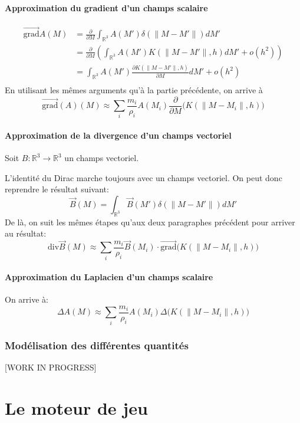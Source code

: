 \documentclass[a4paper,10pt]{report}
\begin{document}
\newpage

\subsubsection{Approximation du gradient d'un champs scalaire}
\begin{align*}
 \vec{\text{grad}}A(M) &= \frac{\partial}{\partial M}\int_{\mathbb{R}^3} A(M')\delta(\lVert M - M' \rVert)dM' \\
      &= \frac{\partial}{\partial M}\left (\int_{\mathbb{R}^3} A(M') K(\lVert M - M' \rVert, h)dM' + o(h^2) \right) \\
      &= \int_{\mathbb{R}^3} A(M')\frac{\partial K(\lVert M - M' \rVert, h)}{\partial M}dM' +o(h^2)\\
\end{align*}
En utilisant les mêmes arguments qu'à la partie précédente, on arrive à
$$
\boxed{ \vec{\text{grad}}(A)(M) \approx \sum_i \frac{m_i}{\rho_i}A(M_i) \frac{\partial}{\partial M} \biggl( K(\lVert M - M_i \rVert, h) \biggl ) }
$$

\subsubsection{Approximation de la divergence d'un champs vectoriel}
Soit $B : \mathbb{R}^3 \to \mathbb{R}^3$ un champs vectoriel.

L'identité du Dirac marche toujours avec un champs vectoriel. On peut donc reprendre le résultat  suivant:
$$\vec{B}(M) = \int_{\mathbb{R}^3} \vec{B}(M')\delta(\lVert M - M' \rVert)dM'$$
De là, on suit les mêmes étapes qu'aux deux paragraphes précédent pour arriver au résultat:
$$
\boxed{ \text{div}\vec{B}(M) \approx \sum_i \frac{m_i}{\rho_i}\vec{B}(M_i) \cdot \vec{\text{grad}} \biggl(K(\lVert M - M_i \rVert, h)\biggl) }
$$

\subsubsection{Approximation du Laplacien d'un champs scalaire}
On arrive à:
$$
\boxed{ \Delta A (M) \approx \sum_i \frac{m_i}{\rho_i}A(M_i) \Delta \biggl(K(\lVert M - M_i \rVert, h)\biggl) }
$$

\subsection{Modélisation des différentes quantités}
[WORK IN PROGRESS]

\chapter{Le moteur de jeu}
\end{document}
